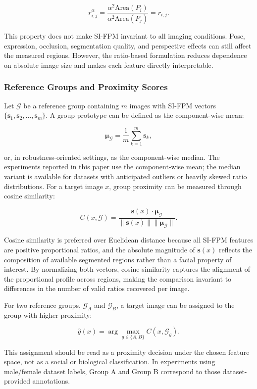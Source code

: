 \documentclass{article}
\begin{document}
\[
r_{i,j}^{\alpha}=\frac{\alpha^2\text{Area}(P_i)}{\alpha^2\text{Area}(P_j)}=r_{i,j}.
\]

This property does not make SI-FPM invariant to all imaging conditions. Pose, expression, occlusion, segmentation quality, and perspective effects can still affect the measured regions. However, the ratio-based formulation reduces dependence on absolute image size and makes each feature directly interpretable.


\subsubsection{Reference Groups and Proximity Scores}
\label{score_calc}

Let $\mathcal{G}$ be a reference group containing $m$ images with SI-FPM vectors $\{\mathbf{s}_1,\mathbf{s}_2,\dots,\mathbf{s}_m\}$. A group prototype can be defined as the component-wise mean:

\[
\boldsymbol{\mu}_{\mathcal{G}}=\frac{1}{m}\sum_{k=1}^{m}\mathbf{s}_k,
\]

or, in robustness-oriented settings, as the component-wise median. The experiments reported in this paper use the component-wise mean; the median variant is available for datasets with anticipated outliers or heavily skewed ratio distributions. For a target image $x$, group proximity can be measured through cosine similarity:

\[
C(x,\mathcal{G})=\frac{\mathbf{s}(x)\cdot\boldsymbol{\mu}_{\mathcal{G}}}{\|\mathbf{s}(x)\|\|\boldsymbol{\mu}_{\mathcal{G}}\|}.
\]

Cosine similarity is preferred over Euclidean distance because all SI-FPM features are positive proportional ratios, and the absolute magnitude of $\mathbf{s}(x)$ reflects the composition of available segmented regions rather than a facial property of interest. By normalizing both vectors, cosine similarity captures the alignment of the proportional profile across regions, making the comparison invariant to differences in the number of valid ratios recovered per image.

For two reference groups, $\mathcal{G}_A$ and $\mathcal{G}_B$, a target image can be assigned to the group with higher proximity:

\[
\hat{g}(x)=\arg\max_{g\in\{A,B\}} C(x,\mathcal{G}_g).
\]

This assignment should be read as a proximity decision under the chosen feature space, not as a social or biological classification. In experiments using male/female dataset labels, Group A and Group B correspond to those dataset-provided annotations.
\end{document}
